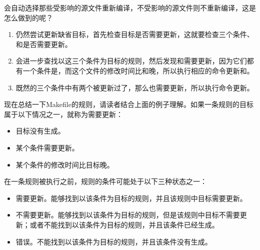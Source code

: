 会自动选择那些受影响的源文件重新编译，不受影响的源文件则不重新编译，这是怎么做到的呢？


\begin{enumerate}

\item {}仍然尝试更新缺省目标，首先检查目标是否需要更新，这就要检查三个条件、和是否需要更新。

\item {}会进一步查找以这三个条件为目标的规则，然后发现和需要更新，因为它们都有一个条件是，而这个文件的修改时间比和晚，所以执行相应的命令更新和。

\item 既然的三个条件中有两个被更新过了，那么也需要更新，所以执行命令更新。
\end{enumerate}


现在总结一下Makefile的规则，请读者结合上面的例子理解。如果一条规则的目标属于以下情况之一，就称为需要更新：


\begin{itemize}

\item 目标没有生成。

\item 某个条件需要更新。

\item 某个条件的修改时间比目标晚。
\end{itemize}


在一条规则被执行之前，规则的条件可能处于以下三种状态之一：


\begin{itemize}

\item 需要更新。能够找到以该条件为目标的规则，并且该规则中目标需要更新。

\item 不需要更新。能够找到以该条件为目标的规则，但是该规则中目标不需要更新；或者不能找到以该条件为目标的规则，并且该条件已经生成。

\item 错误。不能找到以该条件为目标的规则，并且该条件没有生成。
\end{itemize}


